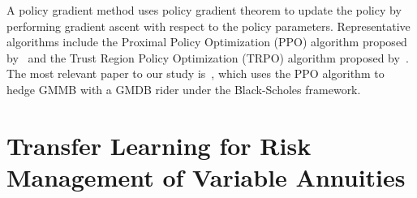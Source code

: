 \begin{enumerate}
    A policy gradient method uses policy gradient theorem to update the policy by performing gradient ascent with respect to the policy parameters.
    Representative algorithms include the Proximal Policy Optimization (PPO) algorithm proposed by~\cite{schulman2017proximal} and the Trust Region Policy Optimization (TRPO) algorithm proposed by~\cite{schulman2015trust}.
    The most relevant paper to our study is~\cite{chong2023pseudo}, which uses the PPO algorithm to hedge GMMB with a GMDB rider under the Black-Scholes framework.
\end{enumerate}

\section{Transfer Learning for Risk Management of Variable Annuities} \label{sec3:tlHedging}

